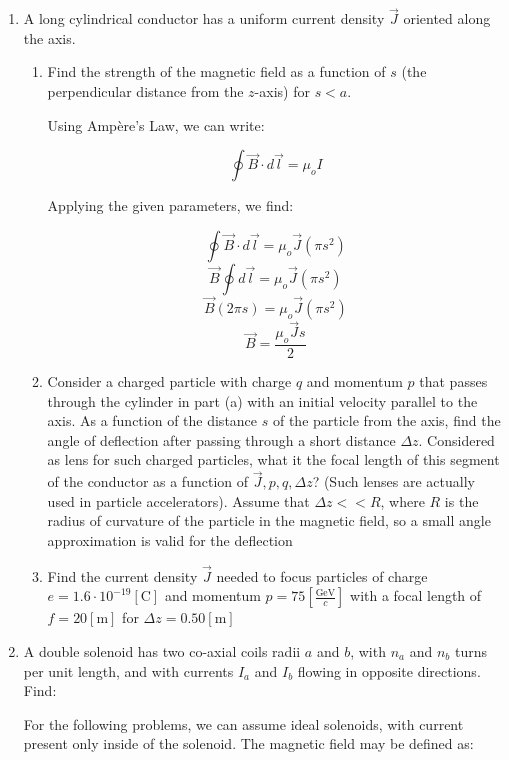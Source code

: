 \begin{enumerate}
  \item A long cylindrical conductor has a uniform current density $\vec{J}$ oriented along the axis.

    \begin{enumerate}

      \item Find the strength of the magnetic field as a function of $s$ (the perpendicular distance from the $z$-axis) for $s<a$.

        Using Amp\`ere's Law, we can write:

        $$\oint\vec{B}\cdot d\vec{l}=\mu_o I$$

        Applying the given parameters, we find:

        $$\oint\vec{B}\cdot d\vec{l}=\mu_o \vec{J}(\pi s^2)$$
        $$\vec{B}\oint d\vec{l}=\mu_o \vec{J}(\pi s^2)$$
        $$\vec{B}(2\pi s)=\mu_o \vec{J}(\pi s^2)$$
        $$\boxed{\vec{B}=\frac{\mu_o \vec{J} s}{2}}$$

      \item Consider a charged particle with charge $q$ and momentum $p$ that passes through the cylinder in part (a) with an initial velocity parallel to the axis.  As a function of the distance $s$ of the particle from the axis, find the angle of deflection after passing through a short distance $\Delta z$. Considered as lens for such charged particles, what it the focal length of this segment of the conductor as a function of $\vec{J},p,q,\Delta z$? (Such lenses are actually used in particle accelerators). Assume that $\Delta z<<R$, where $R$ is the radius of curvature of the particle in the magnetic field, so a small angle approximation is valid for the deflection

      \item Find the current density $\vec{J}$ needed to focus particles of charge $e=1.6\cdot10^{−19}[\si{\coulomb}]$ and momentum $p=75\left[ \frac{\si{\giga\eV}}{c} \right]$ with a focal length of $f=20 [\si{\meter}]$ for $\Delta z=0.50[\si{\meter}]$

    \end{enumerate}

  \item A double solenoid has two co-axial coils radii $a$ and $b$, with $n_a$ and $n_b$ turns per unit length, and with currents $I_a$ and $I_b$ flowing in opposite directions. Find:

    For the following problems, we can assume ideal solenoids, with current present only inside of the solenoid. The magnetic field may be defined as:


\end{enumerate}
